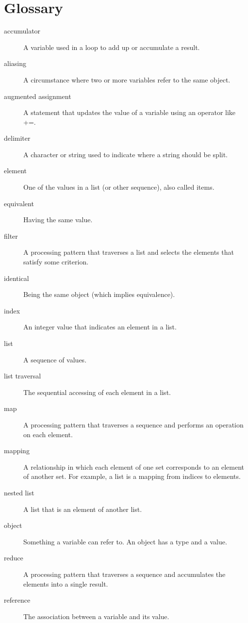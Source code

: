 \documentclass{article}
\begin{document}
\section*{Glossary}
\begin{description}
\item [accumulator] A variable used in a loop to add up or accumulate a result.
\item [aliasing] A circumstance where two or more variables refer to the same object.
\item [augmented assignment] A statement that updates the value of a variable using an operator like +=.
\item [delimiter] A character or string used to indicate where a string should be split.
\item [element] One of the values in a list (or other sequence), also called items.
\item [equivalent] Having the same value.
\item [filter] A processing pattern that traverses a list and selects the elements that satisfy some criterion.
\item [identical] Being the same object (which implies equivalence).
\item [index] An integer value that indicates an element in a list.
\item [list] A sequence of values.
\item [list traversal] The sequential accessing of each element in a list.
\item [map] A processing pattern that traverses a sequence and performs an operation on each element.
\item [mapping] A relationship in which each element of one set corresponds to an element of another set. For example, a list is a mapping from indices to elements.
\item [nested list] A list that is an element of another list.
\item [object] Something a variable can refer to. An object has a type and a value.
\item [reduce] A processing pattern that traverses a sequence and accumulates the elements into a single result.
\item [reference] The association between a variable and its value.
\end{description}
\end{document}
